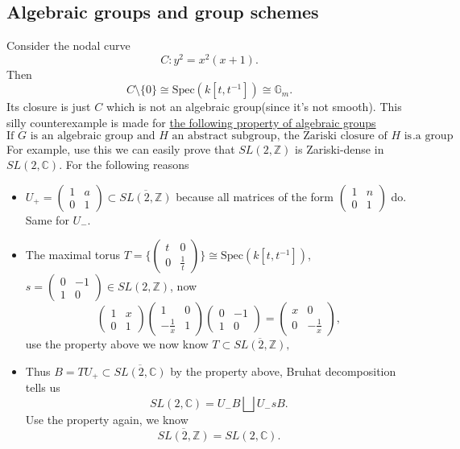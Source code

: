 \documentclass[../main.tex]{subfiles}
\begin{document}
\subsection{Algebraic groups and group schemes}
\begin{example}
Consider the nodal curve 
$$C:y^{2}=x^{2}(x+1).$$
Then $$C\setminus\{0\}\cong \mathrm{Spec}(k[t,t^{-1}])\cong \mathbb{G}_{m}.$$
Its closure is just $C$ which is not an algebraic group(since it's not smooth). This silly counterexample is made for  \href{http://www.jmilne.org/math/CourseNotes/iAG200.pdf}{the following property of algebraic groups}
$$\text{If $G$ is an algebraic group and $H$ an abstract subgroup, the Zariski closure of $H$ is a group}.$$
For example, use this we can easily prove that $SL(2,\mathbb{Z})$ is Zariski-dense in $SL(2,\mathbb{C})$. For the following reasons
\begin{itemize}

\item $U_{+}=\begin{pmatrix}1 & a\\ 0 & 1\end{pmatrix}\subset \overline{SL(2,\mathbb{Z})}$ because all matrices of the form $\begin{pmatrix}1 & n\\ 0 & 1\end{pmatrix}$ do. Same for $U_{-}$.
\item The maximal torus $T=\{\begin{pmatrix}t & 0\\0 & \frac{1}{t}\end{pmatrix}\}\cong \mathrm{Spec}(k[t,t^{-1}])$, $s=\begin{pmatrix}0 & -1\\ 1 & 0\end{pmatrix}\in SL(2,\mathbb{Z})$, now 
$$\begin{pmatrix}1 & x\\ 0 & 1\end{pmatrix}\begin{pmatrix}1 & 0\\ -\frac{1}{x} & 1\end{pmatrix}\begin{pmatrix}0 & -1\\ 1 & 0\end{pmatrix}=\begin{pmatrix}x & 0\\ 0 & -\frac{1}{x}\end{pmatrix},$$
use the property above we now know $T\subset \overline{SL(2,\mathbb{Z})},$

\item Thus $B=TU_{+}\subset \overline{SL(2,\mathbb{C})}$ by the property above, Bruhat decomposition tells us 
$$SL(2,\mathbb{C})=U_{-}B\bigsqcup U_{-}sB.$$
Use the property again, we know
$$\overline{SL(2,\mathbb{Z})}=SL(2,\mathbb{C}).$$
\end{itemize}
\end{example}
\end{document}
